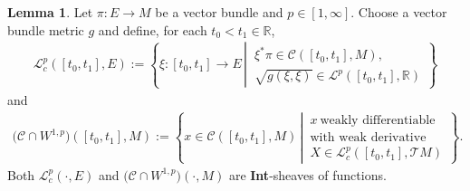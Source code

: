 \documentclass[preprint,12pt]{elsarticle}
\theoremstyle{definition}
\newtheorem{lemma}[theorem]{Lemma}
\newcommand{\set}[1]{\left\lbrace #1\right\rbrace}
\begin{document}
\begin{lemma}\label{lem:weak_sheaves}
Let $\pi:E\to M$ be a vector bundle and $p\in[1,\infty]$. Choose a vector bundle metric $g$ and define, for each $t_0<t_1\in\mathbb{R}$, 
\begin{align*}
\mathcal{L}_c^p([t_0,t_1],E) := \set{\xi:[t_0,t_1]\to E\,\left\vert\,\begin{array}{l}
\xi^*\pi\in\mathcal{C}([t_0,t_1],M),\\
\sqrt{g(\xi,\xi)}\in \mathcal{L}^p([t_0,t_1],\mathbb{R})
\end{array}\right.\!}
\end{align*}
and
\begin{align*}
\big(\mathcal{C}\cap W^{1,p}\big)([t_0,t_1],M) := \set{x\in\mathcal{C}([t_0,t_1],M)\,\left\vert\,\begin{array}{l}
x~\text{weakly~differentiable}\\
\text{with~weak~derivative}\\X\in \mathcal{L}_c^p([t_0,t_1],\mathcal{T}M)
\end{array}\right.\!
}.
\end{align*}
Both $\mathcal{L}_c^p(\cdot,E)$ and $\big(\mathcal{C}\cap W^{1,p}\big)(\cdot,M)$ are \textbf{Int}-sheaves of functions.
\end{lemma}
\end{document}
